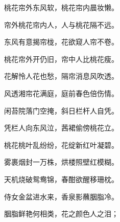 \begin{poem}
    \begin{pl}

        桃花帘外东风软，桃花帘内晨妆懒。
    \end{pl}
    \begin{pl}

        帘外桃花帘内人，人与桃花隔不远。
    \end{pl}
    \begin{pl}

        东风有意揭帘栊，花欲窥人帘不卷。
    \end{pl}
    \begin{pl}

        桃花帘外开仍旧，帘中人比桃花瘦。
    \end{pl}
    \begin{pl}

        花解怜人花也愁，隔帘消息风吹透。
    \end{pl}
    \begin{pl}

        风透湘帘花满庭，庭前春色倍伤情。
    \end{pl}
    \begin{pl}

        闲苔院落门空掩，斜日栏杆人自凭。
    \end{pl}
    \begin{pl}

        凭栏人向东风泣，茜裙偷傍桃花立。
    \end{pl}
    \begin{pl}

        桃花桃叶乱纷纷，花绽新红叶凝碧。
    \end{pl}
    \begin{pl}

        雾裹烟封一万株，烘楼照壁红模糊。
    \end{pl}
    \begin{pl}

        天机烧破鸳鸯锦，春酣欲醒移珊枕。
    \end{pl}
    \begin{pl}

        侍女金盆进水来，香泉影蘸胭脂冷。
    \end{pl}
    \begin{pl}

        胭脂鲜艳何相类，花之颜色人之泪；
    \end{pl}
    \begin{pl}


\end{pl}
\end{poem}
